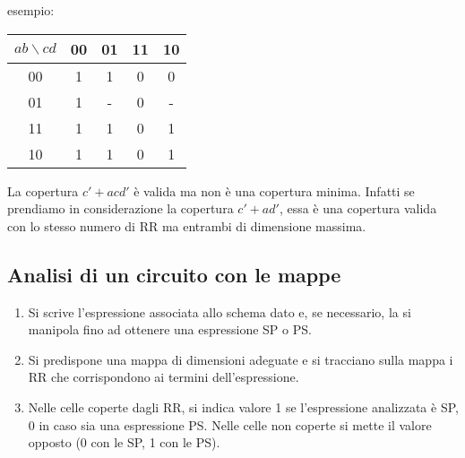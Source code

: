 \documentclass{article}
\begin{document}
\noindent
esempio:

\begin{center}
\begin{tabular}{ |c|c|c|c|c| }
\hline
$ab \backslash cd$ & 00 & 01 & 11 & 10 \\
\hline
\hline
00 & 1 & 1 & 0 & 0 \\
01 & 1 & - & 0 & - \\
11 & 1 & 1 & 0 & 1 \\
10 & 1 & 1 & 0 & 1 \\
\hline
\end{tabular}
\end{center}

\noindent
La copertura $c' + acd'$ è valida ma non è una copertura minima.
Infatti se prendiamo in considerazione la copertura $c' + ad'$, essa è una copertura valida con lo stesso numero di RR ma entrambi di dimensione massima.

\subsection{Analisi di un circuito con le mappe}

\begin{enumerate}
    \item Si scrive l'espressione associata allo schema dato e, se necessario, la si manipola fino ad ottenere una espressione SP o PS.
    \item Si predispone una mappa di dimensioni adeguate e si tracciano sulla mappa i RR che corrispondono ai termini dell'espressione.
    \item Nelle celle coperte dagli RR, si indica valore 1 se l'espressione analizzata è SP, 0 in caso sia una espressione PS. Nelle celle non coperte si mette il valore opposto (0 con le SP, 1 con le PS).
\end{enumerate}
\end{document}
